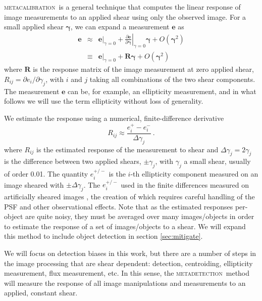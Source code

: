 \documentclass[iop, appendixfloats, numberedappendix, apj]{emulateapj}
\newcommand{\mcal}{\textsc{metacalibration}}
\newcommand{\mdet}{\textsc{metadetection}}
\begin{document}
\mcal\ is a general technique that computes the linear response of image
measurements to an applied shear using only the observed image.  For a small
applied shear $\boldsymbol{\gamma}$, we can expand a measurement $\boldsymbol{e}$ as
\begin{eqnarray}
\boldsymbol{e} & \approx & \left.\boldsymbol{e}\right|_{\gamma=0} +
                           \left.\frac{\partial \boldsymbol{e}}{\partial\boldsymbol\gamma}\right|_{\gamma=0} \boldsymbol\gamma +
                           O(\boldsymbol\gamma^2)\nonumber\\
               & \equiv  & \left.\boldsymbol{e}\right|_{\gamma=0} +
                           \boldsymbol{R} \boldsymbol\gamma +
                           O(\boldsymbol\gamma^2)
\end{eqnarray}
where $\boldsymbol{R}$ is the response matrix of the image measurement
at zero applied shear, $R_{ij}=\partial e_i /\partial \gamma_j$, with $i$ and
$j$ taking all combinations of the two shear components.  The measurement
$\boldsymbol{e}$ can be, for example,  an ellipticity measurement, and in what
follows we will use the term ellipticity without loss of generality.

We estimate the response using a numerical, finite-difference derivative
\begin{equation}
R_{ij} \approx \frac{e_i^{+} - e_i^{-}}{\Delta\gamma_j}\ .
\end{equation}
where $R_{ij}$ is the estimated response of the measurement to shear and
$\Delta\gamma_j = 2 \gamma_j$ is the difference between two applied shears,
$\pm \gamma_j$, with $\gamma_j$ a small shear, usually of order 0.01. The
quantity $e_i^{+/-}$ is the $i$-th ellipticity component measured on an image
sheared with $\pm\Delta\gamma_j$.  The $e_i^{+/-}$ used in the finite
differences measured on artificially sheared images \citep{SheldonMcal2017},
the creation of which requires careful handling of the PSF and other
observational effects.  Note that as the estimated responses per-object are
quite noisy, they must be averaged over many images/objects in order to
estimate the response of a set of images/objects to a shear.
We will expand this method to include object detection in section
\ref{sec:mitigate}.

We will focus on detection biases in this work, but there are a number of steps
in the image processing that are shear dependent: detection, centroiding,
ellipticity measurement, flux measurement, etc.  In this sense, the \mdet\
method will measure the response of all image manipulations and measurements to
an applied, constant shear.
\end{document}
